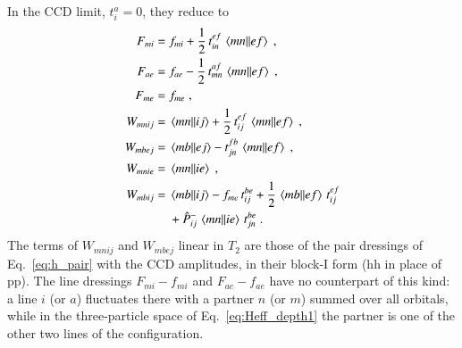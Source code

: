 \documentclass[aip,jcp,reprint,noshowkeys,superscriptaddress]{revtex4-1}
\newcommand{\pp}{\text{pp}}
\newcommand{\hh}{\text{hh}}
\begin{document}
In the CCD limit, $t_i^a=0$, they reduce to
\begin{align}
F_{mi}={}&f_{mi}+\frac12\,t_{in}^{ef}\,\mel{mn}{}{ef} \;,
\nonumber\\
F_{ae}={}&f_{ae}-\frac12\,t_{mn}^{af}\,\mel{mn}{}{ef} \;,
\nonumber\\
F_{me}={}&f_{me} \;,
\nonumber\\
W_{mnij}={}&\mel{mn}{}{ij}+\frac12\,t_{ij}^{ef}\,\mel{mn}{}{ef} \;,
\nonumber\\
W_{mbej}={}&\mel{mb}{}{ej}-t_{jn}^{fb}\,\mel{mn}{}{ef} \;,
\nonumber\\
W_{mnie}={}&\mel{mn}{}{ie} \;,
\nonumber\\
W_{mbij}={}&\mel{mb}{}{ij}-f_{me}\,t_{ij}^{be}
+\frac12\,\mel{mb}{}{ef}\,t_{ij}^{ef}
\nonumber\\
&+\hat P^-_{ij}\,\mel{mn}{}{ie}\,t_{jn}^{be} \;.
\label{eq:eom_ccd}
\end{align}
The terms of $W_{mnij}$ and $W_{mbej}$ linear in $T_2$ are those of the
pair dressings of Eq.~\eqref{eq:h_pair} with the CCD amplitudes, in their
block-I form ($\hh$ in place of $\pp$). The line dressings $F_{mi}-f_{mi}$ and $F_{ae}-f_{ae}$ have no
counterpart of this kind: a line $i$ (or $a$) fluctuates there with a
partner $n$ (or $m$) summed over all orbitals, while in the three-particle
space of Eq.~\eqref{eq:Heff_depth1} the partner is one of the other two
lines of the configuration.


\end{document}
